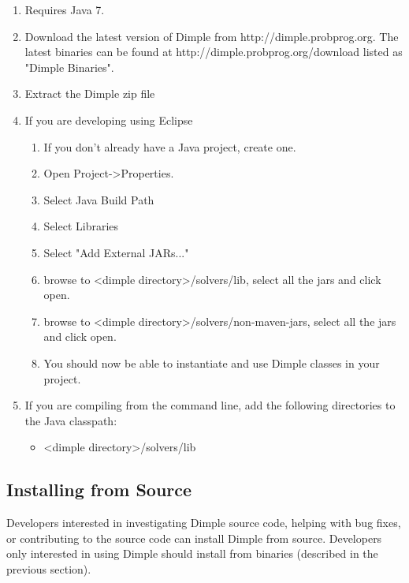 \fi

\ifjava

\begin{enumerate}
\item Requires Java 7.
\item Download the latest version of Dimple from http://dimple.probprog.org.  The latest binaries can be found at http://dimple.probprog.org/download listed as "Dimple Binaries".
\item Extract the Dimple  zip file
\item If you are developing using Eclipse
\begin{enumerate}
\item If you don't already have a Java project, create one.
\item Open Project-\textgreater Properties.
\item Select Java Build Path
\item Select Libraries
\item Select "Add External JARs..."
\item browse to \textless dimple directory\textgreater /solvers/lib, select all the jars and click open.
\item browse to \textless dimple directory\textgreater /solvers/non-maven-jars, select all the jars and click open.
\item You should now be able to instantiate and use Dimple classes in your project.
\end{enumerate}
\item If you are compiling from the command line, add the following directories to the Java classpath:
\begin{itemize}
\item \textless dimple directory\textgreater /solvers/lib
\end{itemize}
\end{enumerate}

\fi

\subsection{Installing from Source}

Developers interested in investigating Dimple source code, helping with bug fixes, or contributing to the source code can install Dimple from source.  Developers only interested in using Dimple should install from binaries (described in the previous section).

